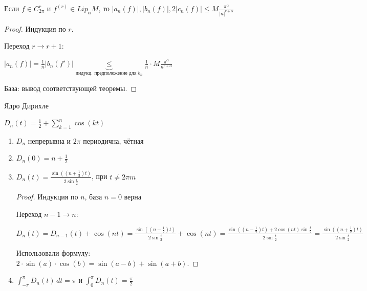 \begin{consequence}
    Если $f \in C_{2\pi}^r$ и $f^{(r)} \in Lip_{\alpha} M$, то $|a_n(f)|, |b_n (f)|, 2|c_n (f)| \leqslant M \frac{\pi^\alpha}{|n|^{r + \alpha}}$
\end{consequence}

\begin{proof}
    Индукция по $r$.

    Переход $r \to r + 1$:

    $| a_n(f) | = \frac{1}{n} |b_n(f')| \underbrace{\leq}_{\text{индукц. предположение для } b_n} \frac{1}{n} \cdot M \frac{\pi^{\alpha}}{n^{r + \alpha}}$

    База: вывод соответствующей теоремы.
\end{proof}

\begin{definition}
    Ядро Дирихле

    $D_n (t) = \frac{1}{2} + \sum_{k = 1}^n \cos (kt)$
\end{definition}

\begin{properties}
    \begin{enumerate}
        \item $D_n$ непрерывна и $2\pi$ периодична, чётная
        \item $D_n (0) = n + \frac{1}{2}$
        \item {
            $D_n (t) = \frac{\sin ((n + \frac{1}{2})t)}{2\sin \frac{t}{2}}$, при $t \neq 2\pi m$

            \begin{proof}
                Индукция по $n$, база $n = 0$ верна

                Переход $n - 1 \to n$:
                
                $D_{n} (t) = D_{n - 1} (t) + \cos (nt) = \frac{\sin ((n - \frac{1}{2})t)}{2\sin \frac{t}{2}} + \cos (nt) = \frac{\sin ((n - \frac{1}{2})t) + 2\cos (nt) \sin \frac{t}{2}}{2\sin \frac{t}{2}} = \frac{\sin ((n + \frac{1}{2})t)}{2\sin \frac{t}{2}}$

                Использовали формулу: $2 \cdot \sin(a) \cdot \cos(b) = \sin(a - b) + \sin(a + b)$.
            \end{proof}
        }
        \item $\int_{-\pi}^\pi D_n (t) \, dt = \pi$ и $\int_0^\pi D_n (t) = \frac{\pi}{2}$
    \end{enumerate}
\end{properties}

